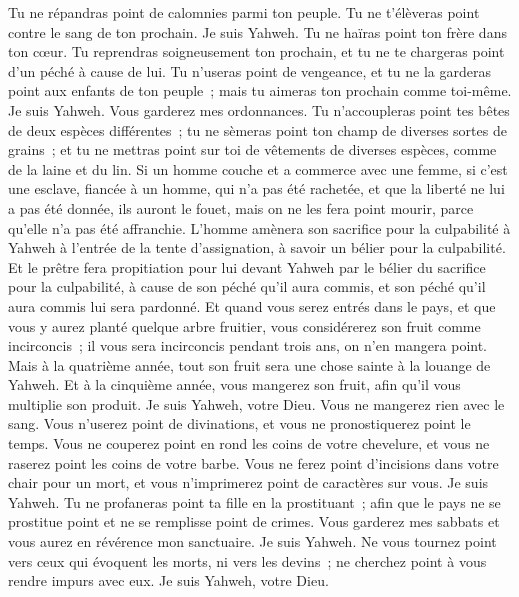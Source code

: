 \begin{multicols}{2}
Tu ne répandras point de calomnies parmi ton peuple. Tu ne t'élèveras point contre le sang de ton prochain. Je suis Yahweh.
Tu ne haïras point ton frère dans ton cœur. Tu reprendras soigneusement ton prochain, et tu ne te chargeras point d'un péché à cause de lui.
Tu n'useras point de vengeance, et tu ne la garderas point aux enfants de ton peuple~; mais tu aimeras ton prochain comme toi-même. Je suis Yahweh.
Vous garderez mes ordonnances. Tu n'accoupleras point tes bêtes de deux espèces différentes~; tu ne sèmeras point ton champ de diverses sortes de grains~; et tu ne mettras point sur toi de vêtements de diverses espèces, comme de la laine et du lin.
Si un homme couche et a commerce avec une femme, si c'est une esclave, fiancée à un homme, qui n'a pas été rachetée, et que la liberté ne lui a pas été donnée, ils auront le fouet, mais on ne les fera point mourir, parce qu'elle n'a pas été affranchie.
L'homme amènera son sacrifice pour la culpabilité à Yahweh à l'entrée de la tente d'assignation, à savoir un bélier pour la culpabilité.
Et le prêtre fera propitiation pour lui devant Yahweh par le bélier du sacrifice pour la culpabilité, à cause de son péché qu'il aura commis, et son péché qu'il aura commis lui sera pardonné.
Et quand vous serez entrés dans le pays, et que vous y aurez planté quelque arbre fruitier, vous considérerez son fruit comme incirconcis~; il vous sera incirconcis pendant trois ans, on n'en mangera point.
Mais à la quatrième année, tout son fruit sera une chose sainte à la louange de Yahweh.
Et à la cinquième année, vous mangerez son fruit, afin qu'il vous multiplie son produit. Je suis Yahweh, votre Dieu.
Vous ne mangerez rien avec le sang. Vous n'userez point de divinations, et vous ne pronostiquerez point le temps.
Vous ne couperez point en rond les coins de votre chevelure, et vous ne raserez point les coins de votre barbe.
Vous ne ferez point d'incisions dans votre chair pour un mort, et vous n'imprimerez point de caractères sur vous. Je suis Yahweh.
Tu ne profaneras point ta fille en la prostituant~; afin que le pays ne se prostitue point et ne se remplisse point de crimes.
Vous garderez mes sabbats et vous aurez en révérence mon sanctuaire. Je suis Yahweh.
Ne vous tournez point vers ceux qui évoquent les morts, ni vers les devins~; ne cherchez point à vous rendre impurs avec eux. Je suis Yahweh, votre Dieu.

\end{multicols}
